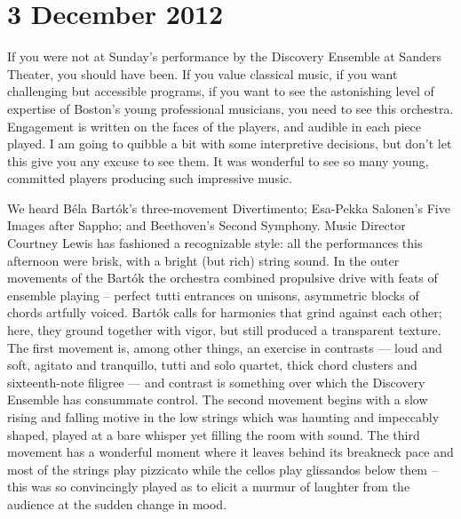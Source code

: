 \chapter{3 December 2012}

If you were not at Sunday’s performance by the Discovery Ensemble at Sanders Theater, you should have been. If you value classical music, if you want challenging but accessible programs, if you want to see the astonishing level of expertise of Boston’s young professional musicians, you need to see this orchestra. Engagement is written on the faces of the players, and audible in each piece played. I am going to quibble a bit with some interpretive decisions, but don’t let this give you any excuse to see them. It was wonderful to see so many young, committed players producing such impressive music.

We heard Béla Bartók’s three-movement Divertimento; Esa-Pekka Salonen’s Five Images after Sappho; and Beethoven’s Second Symphony. Music Director Courtney Lewis has fashioned a recognizable style: all the performances this afternoon were brisk, with a bright (but rich) string sound. In the outer movements of the Bartók the orchestra combined propulsive drive with feats of ensemble playing – perfect tutti entrances on unisons, asymmetric blocks of chords artfully voiced. Bartók calls for harmonies that grind against each other; here, they ground together with vigor, but still produced a transparent texture. The first movement is, among other things, an exercise in contrasts — loud and soft, agitato and tranquillo, tutti and solo quartet, thick chord clusters and sixteenth-note filigree — and contrast is something over which the Discovery Ensemble has consummate control. The second movement begins with a slow rising and falling motive in the low strings which was haunting and impeccably shaped, played at a bare whisper yet filling the room with sound. The third movement has a wonderful moment where it leaves behind its breakneck pace and most of the strings play pizzicato while the cellos play glissandos below them – this was so convincingly played as to elicit a murmur of laughter from the audience at the sudden change in mood.

